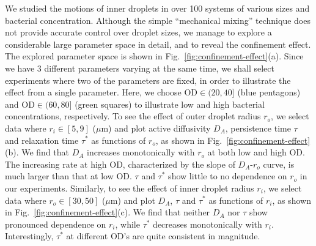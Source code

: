 \documentclass[%
10pt,
superscriptaddress,
twocolumn,
 amsmath,amssymb,
 aps,prx,
]{revtex4-2}
\begin{document}
We studied the motions of inner droplets in over 100 systems of various sizes and bacterial concentration.
Although the simple ``mechanical mixing'' technique does not provide accurate control over droplet sizes, we manage to explore a considerable large parameter space in detail, and to reveal the confinement effect.
The explored parameter space is shown in Fig.~\ref{fig:confinement-effect}(a).
Since we have 3 different parameters varying at the same time, we shall select experiments where two of the parameters are fixed, in order to illustrate the effect from a single parameter.
Here, we choose $\text{OD}\in(20, 40]$ (blue pentagons) and $\text{OD}\in(60, 80]$ (green squares) to illustrate low and high bacterial concentrations, respectively.
To see the effect of outer droplet radius $r_o$, we select data where $r_i\in[5, 9]$ ($\mu$m) and plot active diffusivity $D_A$, persistence time $\tau$ and relaxation time $\tau^*$ as functions of $r_o$, as shown in Fig.~\ref{fig:confinement-effect}(b).
We find that $D_A$ increases monotonically with $r_o$ at both low and high OD.
The increasing rate at high OD, characterized by the slope of $D_A$-$r_o$ curve, is much larger than that at low OD.
$\tau$ and $\tau^*$ show little to no dependence on $r_o$ in our experiments.
Similarly, to see the effect of inner droplet radius $r_i$, we select data where $r_o\in[30, 50]$ ($\mu$m) and plot $D_A$, $\tau$ and $\tau^*$ as functions of $r_i$, as shown in Fig.~\ref{fig:confinement-effect}(c).
We find that neither $D_A$ nor $\tau$ show pronounced dependence on $r_i$, while $\tau^*$ decreases monotonically with $r_i$.
Interestingly, $\tau^*$ at different OD's are quite consistent in magnitude.

\end{document}
